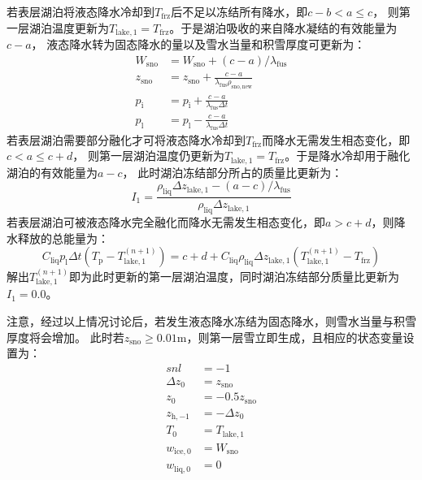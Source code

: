若表层湖泊将液态降水冷却到$T_{\mathrm {frz}} $后不足以冻结所有降水，即$c-b<a\leqslant c$，
则第一层湖泊温度更新为$T_{\mathrm{lake,1}}=T_{\mathrm {frz}} $。于是湖泊吸收的来自降水凝结的有效能量为$c-a$，
液态降水转为固态降水的量以及雪水当量和积雪厚度可更新为：
\begin{equation}
  \begin{aligned}
    W_{\mathrm{sno}} &= W_{\mathrm{sno}} + (c-a) / \lambda_{\mathrm {fus}}  \\
    z_{\mathrm{sno}} &= z_{\mathrm{sno}} + \frac{c-a}{\lambda_{\mathrm {fus}}  \rho_{\mathrm{sno,new}}} \\
    p_{\mathrm {i}}  &= p_{\mathrm {i}}  + \frac{c-a}{\lambda_{\mathrm {fus}}  \Delta t} \\
    p_{\mathrm {l}}  &= p_{\mathrm {l}}  - \frac{c-a}{\lambda_{\mathrm {fus}}  \Delta t}
  \end{aligned}
\end{equation}
若表层湖泊需要部分融化才可将液态降水冷却到$T_{\mathrm {frz}} $而降水无需发生相态变化，即$c<a\leqslant c+d$，
则第一层湖泊温度仍更新为$T_{\mathrm{lake,1}}=T_{\mathrm {frz}} $。于是降水冷却用于融化湖泊的有效能量为$a-c$，
此时湖泊冻结部分所占的质量比更新为：
\begin{equation}
  I_{1}=\frac{\rho_{\mathrm{liq}} \Delta z_{\mathrm{lake, 1}}-(a-c) / \lambda_{\mathrm {fus}}}{\rho_{\mathrm{liq}} \Delta z_{\mathrm{lake, 1}}}
\end{equation}
若表层湖泊可被液态降水完全融化而降水无需发生相态变化，即$a>c+d$，则降水释放的总能量为：
\begin{equation}
  C_{\mathrm{liq}} p_{\mathrm{l}} \Delta t\left(T_{\mathrm{p}}-T_{\mathrm{lake, 1}}^{(n+1)}\right)=c+d+C_{\mathrm{liq}} \rho_{\mathrm{liq}} \Delta z_{\mathrm{lake, 1}}\left(T_{\mathrm{lake, 1}}^{(n+1)}-T_{\mathrm {frz}}\right)
\end{equation}
解出$T_{\mathrm{lake,1}}^{\left(n+1\right)}$即为此时更新的第一层湖泊温度，同时湖泊冻结部分质量比更新为$I_1=0.0$。


注意，经过以上情况讨论后，若发生液态降水冻结为固态降水，则雪水当量与积雪厚度将会增加。
此时若$z_{\mathrm{sno}}\geqslant 0.01$m，则第一层雪立即生成，且相应的状态变量设置为：
\begin{equation}
  \begin{aligned}
    snl &= -1 \\
    \Delta z_{0} &= z_{\mathrm{sno}} \\
    z_{0} &= -0.5 z_{\mathrm{sno}} \\
    z_{\mathrm{h,-1}} &= -\Delta z_{0} \\
    T_{0} &= T_{\mathrm{lake, 1}} \\
    w_{\mathrm{ice, 0}} &= W_{\mathrm{sno}} \\
    w_{\mathrm{liq, 0}} &= 0
  \end{aligned}
\end{equation}

